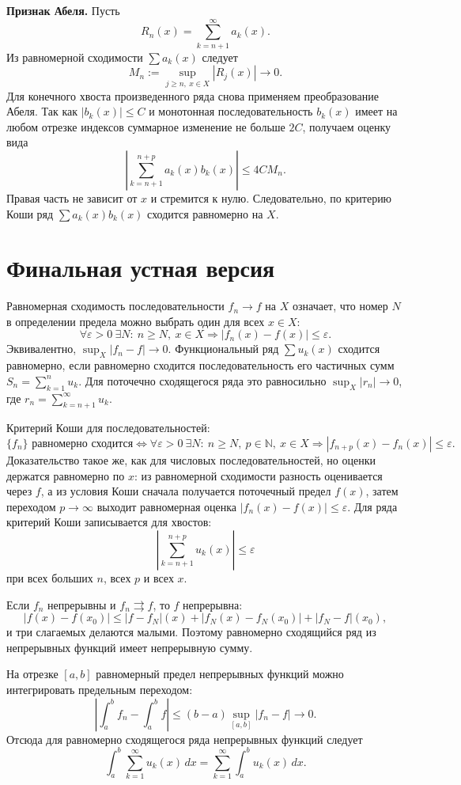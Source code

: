 \documentclass[12pt,a4paper]{article}
\newcommand{\eps}{\varepsilon}
\newcommand{\dd}{\,d}
\begin{document}
\textbf{Признак Абеля.}
Пусть
\[
  R_n(x)=\sum_{k=n+1}^{\infty}a_k(x).
\]
Из равномерной сходимости \(\sum a_k(x)\) следует
\[
  M_n:=\sup_{j\ge n,\ x\in X}|R_j(x)|\to0.
\]
Для конечного хвоста произведенного ряда снова применяем преобразование
Абеля. Так как \(|b_k(x)|\le C\) и монотонная последовательность \(b_k(x)\)
имеет на любом отрезке индексов суммарное изменение не больше \(2C\), получаем
оценку вида
\[
  \left|\sum_{k=n+1}^{n+p}a_k(x)b_k(x)\right|
  \le
  4C M_n.
\]
Правая часть не зависит от \(x\) и стремится к нулю. Следовательно, по
критерию Коши ряд \(\sum a_k(x)b_k(x)\) сходится равномерно на \(X\).

\section*{Финальная устная версия}

Равномерная сходимость последовательности \(f_n\to f\) на \(X\) означает, что
номер \(N\) в определении предела можно выбрать один для всех \(x\in X\):
\[
  \forall\eps>0\ \exists N:\ n\ge N,\ x\in X
  \Rightarrow |f_n(x)-f(x)|\le\eps.
\]
Эквивалентно, \(\sup_X|f_n-f|\to0\). Функциональный ряд
\(\sum u_k(x)\) сходится равномерно, если равномерно сходится
последовательность его частичных сумм \(S_n=\sum_{k=1}^n u_k\). Для поточечно
сходящегося ряда это равносильно \(\sup_X|r_n|\to0\), где
\(r_n=\sum_{k=n+1}^{\infty}u_k\).

Критерий Коши для последовательностей:
\[
  \{f_n\}\text{ равномерно сходится}
  \Longleftrightarrow
  \forall\eps>0\ \exists N:\ n\ge N,\ p\in\mathbb N,\ x\in X
  \Rightarrow |f_{n+p}(x)-f_n(x)|\le\eps.
\]
Доказательство такое же, как для числовых последовательностей, но оценки
держатся равномерно по \(x\): из равномерной сходимости разность оценивается
через \(f\), а из условия Коши сначала получается поточечный предел
\(f(x)\), затем переходом \(p\to\infty\) выходит равномерная оценка
\(|f_n(x)-f(x)|\le\eps\). Для ряда критерий Коши записывается для хвостов:
\[
  \left|\sum_{k=n+1}^{n+p}u_k(x)\right|\le\eps
\]
при всех больших \(n\), всех \(p\) и всех \(x\).

Если \(f_n\) непрерывны и \(f_n\rightrightarrows f\), то \(f\) непрерывна:
\[
  |f(x)-f(x_0)|\le |f-f_N|(x)+|f_N(x)-f_N(x_0)|+|f_N-f|(x_0),
\]
и три слагаемых делаются малыми. Поэтому равномерно сходящийся ряд из
непрерывных функций имеет непрерывную сумму.

На отрезке \([a,b]\) равномерный предел непрерывных функций можно
интегрировать предельным переходом:
\[
  \left|\int_a^b f_n-\int_a^b f\right|
  \le (b-a)\sup_{[a,b]}|f_n-f|\to0.
\]
Отсюда для равномерно сходящегося ряда непрерывных функций следует
\[
  \int_a^b\sum_{k=1}^{\infty}u_k(x)\dd x
  =
  \sum_{k=1}^{\infty}\int_a^b u_k(x)\dd x.
\]
\end{document}
